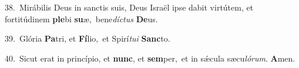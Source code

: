 {\numbfont\textcolor{\numbcolor}{38.}}~Mirábilis Deus in sanctis suis, Deus Israël ipse dabit virtútem, et fortitúdinem \textbf{ple}\-bi \textbf{su}\-æ,~\star bene\-\textit{díc}\-\textit{tus} \textbf{De}\-us.\par
{\numbfont\textcolor{\numbcolor}{39.}}~Glória \textbf{Pa}\-tri, et \textbf{Fí}\-lio,~\star et Spirí\-\textit{tu}\-\textit{i} \textbf{Sanc}\-to.\par
{\numbfont\textcolor{\numbcolor}{40.}}~Sicut erat in princípio, et \textbf{nunc}\-, et \textbf{sem}\-per,~\star et in sǽcula sæcu\-\textit{ló}\-\textit{rum}. \textbf{A}\-men.\par
